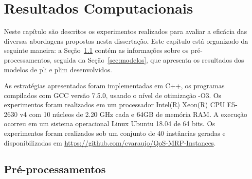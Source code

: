 \chapter{Resultados Computacionais} \label{chp:resultados}

Neste capítulo são descritos os  experimentos realizados para avaliar a eficácia
das  diversas  abordagens  propostas   nesta  dissertação.  Este  capítulo  está
organizado  da seguinte  maneira: a  Seção~\ref{sec:prep} contém  as informações
sobre os  pré-processamentos, seguida da Seção~\ref{sec:modelos},  que apresenta
os resultados dos modelos de \gls{pli} e \gls{plim} desenvolvidos.


As estratégias apresentadas foram implementadas  em C++, os programas compilados
com GCC  versão 7.5.0, usando o  nível de otimização -O3.  Os experimentos foram
realizados em um  processador Intel(R) Xeon(R) CPU E5-2630 v4  com 10 núcleos de
2.20  GHz  cada  e 64GB  de  memória  RAM.  A  execução ocorreu  em  um  sistema
operacional Linux Ubuntu 18.04 de 64  bits. Os experimentos foram realizados sob
um    conjunto    de   40    instâncias    geradas    e   disponibilizadas    em
\url{https://github.com/cvaraujo/QoS-MRP-Instances}.

\section{Pré-processamentos} \label{sec:prep}


